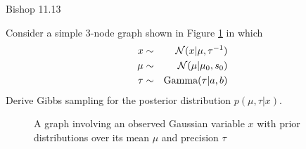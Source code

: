 \documentclass{amsmlaj}
\begin{document}
\begin{problem}\textsf{Bishop 11.13}

\noindent Consider a simple 3-node graph shown in Figure \ref{fig:gauss} in which
\begin{eqnarray}
x & \sim & \mathcal{N}(x|\mu,\tau^{-1}) \nonumber\\
\mu & \sim & \mathcal{N}(\mu|\mu_0,s_0) \nonumber\\
\tau & \sim & \text{Gamma}(\tau|a,b)
\end{eqnarray}
Derive Gibbs sampling for the posterior distribution $p(\mu,\tau|x)$.
\begin{figure}[H]
\begin{center}
\caption{A graph involving an observed Gaussian variable $x$ with prior distributions over its mean $\mu$ and precision $\tau$}
\label{fig:gauss}
\end{center}
\end{figure}
\end{problem}
\end{document}
